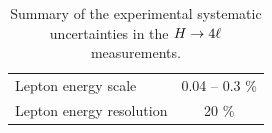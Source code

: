 \begin{table}[!htb]
\begin{center}
\begin{tabular}{l|c}
Lepton energy scale & 0.04 -- 0.3 \% \\ 
Lepton energy resolution & 20 \% \\ 
\hline %
\end{tabular}
\caption{
Summary of the experimental systematic uncertainties in the $H\to4\ell$ measurements. %
\label{tab:SystOverview}
}
\normalsize
\end{center}
\end{table}



